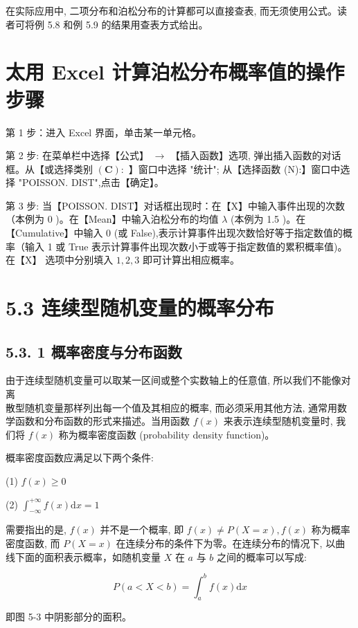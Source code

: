 \documentclass[10pt]{article}
\begin{document}
\begin{CJK*}{UTF8}{bsmi}
在实际应用中, 二项分布和泊松分布的计算都可以直接查表, 而无须使用公式。读者可将例 5.8 和例 5.9 的结果用查表方式给出。

\section*{太用 Excel 计算泊松分布概率值的操作步骤}
第 1 步：进入 Excel 界面，单击某一单元格。

第 2 步: 在菜单栏中选择【公式】 $\rightarrow$ 【插入函数】选项, 弹出插入函数的对话框。从【或选择类别 $(\mathbf{C}):$ 】窗口中选择 "统计"; 从【选择函数 (N):】窗口中选择 "POISSON. DIST",点击【确定】。

第 3 步: 当【POISSON. DIST】对话框出现时：在【X】中输入事件出现的次数（本例为 0 )。在【Mean】中输入泊松分布的均值 $\lambda$ (本例为 1.5 )。在【Cumulative】中输入 0 (或 False),表示计算事件出现次数恰好等于指定数值的概率（输入 1 或 True 表示计算事件出现次数小于或等于指定数值的累积概率值)。在【X】 选项中分别填入 $1,2,3$ 即可计算出相应概率。

\section*{5.3 连续型随机变量的概率分布}
\subsection*{5.3. 1 概率密度与分布函数}
由于连续型随机变量可以取某一区间或整个实数轴上的任意值, 所以我们不能像对离\\
散型随机变量那样列出每一个值及其相应的概率, 而必须采用其他方法, 通常用数学函数和分布函数的形式来描述。当用函数 $f(x)$ 来表示连续型随机变量时, 我们将 $f(x)$ 称为概率密度函数 (probability density function)。

概率密度函数应满足以下两个条件:

(1) $f(x) \geqslant 0$

(2) $\int_{-\infty}^{+\infty} f(x) \mathrm{d} x=1$

需要指出的是, $f(x)$ 并不是一个概率, 即 $f(x) \neq P(X=x), f(x)$ 称为概率密度函数, 而 $P(X=x)$ 在连续分布的条件下为零。在连续分布的情况下, 以曲线下面的面积表示概率，如随机变量 $X$ 在 $a$ 与 $b$ 之间的概率可以写成:


\begin{equation*}
P(a<X<b)=\int_{a}^{b} f(x) \mathrm{d} x \tag{5.16}
\end{equation*}


即图 5-3 中阴影部分的面积。

\begin{center}
\end{center}


\end{CJK*}
\end{document}
